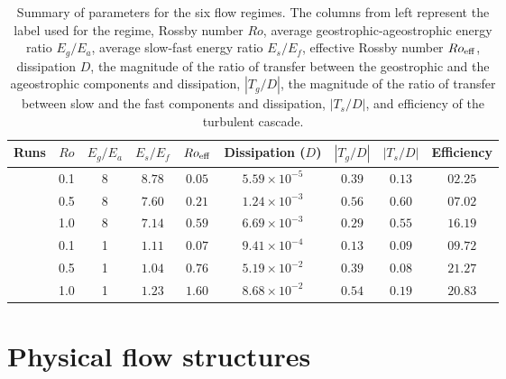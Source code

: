 \documentclass[../Rajarshi-thesis-draft.tex]{subfiles}
\begin{document}
	\begin{table}
		\centering
		\begin{tabular}{ccccccccc}
			\hline
			Runs & $Ro$ & $E_g/E_a$ & ${E_s}/{E_f}$ & $Ro_{\operatorname{eff}}$ & Dissipation ($D$) &$|T_{g}/D|$ & $|T_{s}/D|$ & Efficiency \\ %
			\hline
			\lre &0.1 & 8 & $8.78$ & $0.05$ & $5.59\times 10^{-5}$ & $ 0.39$ &$ 0.13$& $02.25$ \\ %
			\ire &0.5 & 8 & $7.60$ & $0.21$ & $1.24\times 10^{-3}$ & $ 0.56$ &$ 0.60$& $07.02$ \\ %
			\hre &1.0 & 8 & $7.14$ & $0.59$ & $6.69\times 10^{-3}$ & $ 0.29$ &$ 0.55$& $16.19$ \\ %
			\lro &0.1 & 1 & $1.11$ & $0.07$ & $9.41\times 10^{-4}$ & $ 0.13$ &$ 0.09$& $09.72$ \\ %
			\iro &0.5 & 1 & $1.04$ & $0.76$ & $5.19\times 10^{-2}$ & $ 0.39$ &$ 0.08$& $21.27$ \\ %
			\hro &1.0 & 1 & $1.23$ & $1.60$ & $8.68\times 10^{-2}$ & $ 0.54$ &$ 0.19$& $20.83$ \\ %
			\hline
		\end{tabular}
		\caption[Parameters of the six tide-eddy flow regimes]{ Summary of parameters for the six flow regimes. The columns from left represent the label used for the regime, Rossby number $Ro$, average geostrophic-ageostrophic energy ratio $E_g/E_a$, average slow-fast energy ratio ${E_s}/{E_f}$, effective Rossby number $Ro_{\operatorname{eff}}$, dissipation $D$, the magnitude of the ratio of transfer between the geostrophic and the ageostrophic components and dissipation, $|T_{g}/D|$, the magnitude of the ratio of transfer between slow and the fast components and dissipation, $|T_{s}/D|$, and efficiency of the turbulent cascade. } %
		\label{edwv-t1}
	\end{table}
	

\section{Physical flow structures}\label{edwv-ps}
\end{document}
